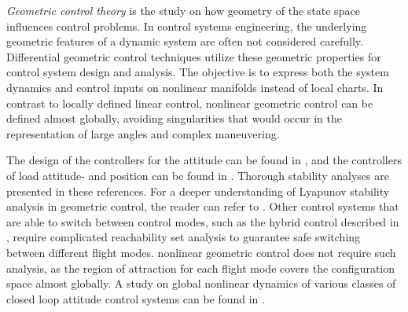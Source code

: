 \textit{Geometric control theory} is the study on how geometry of the state space influences control problems. 
In control systems engineering, the underlying geometric features of a dynamic system are often not considered carefully. 
Differential geometric control techniques utilize these geometric properties for control system design and analysis.
The objective is to express both the system dynamics and control inputs on nonlinear manifolds instead of local charts. 
In contrast to locally defined linear control, nonlinear geometric control can be defined almost globally, avoiding singularities that would occur in the representation of large angles and complex maneuvering.

The design of the controllers for the  attitude can be found in \cite{Lee2010}, and the controllers of load attitude- and position can be found in \cite{Sreenath2013c}. Thorough stability analyses are presented in these references. For a deeper understanding of Lyapunov stability analysis in geometric control, the reader can refer to \cite{Bullo2005,Chaturvedi2011}.
Other control systems that are able to switch between control modes, such as the hybrid control described in \cite{Gillula2010}, require complicated reachability set analysis to guarantee safe switching between different flight modes.
nonlinear geometric control does not require such analysis, as the region of attraction for each flight mode covers the configuration space almost globally. A study on global nonlinear dynamics of various classes of closed loop attitude control systems can be found in \cite{Chaturvedi2011}. 

%
%
%
%
%
%
%

